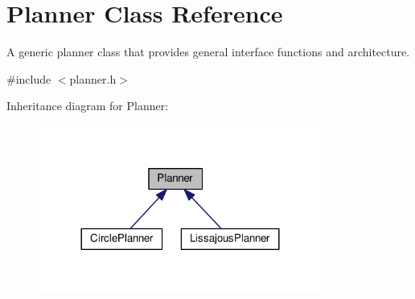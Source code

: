 \hypertarget{classPlanner}{}\section{Planner Class Reference}
\label{classPlanner}


A generic planner class that provides general interface functions and architecture.  




{\ttfamily \#include $<$planner.\+h$>$}



Inheritance diagram for Planner\+:\nopagebreak
\begin{figure}[H]
\begin{center}
\leavevmode
\includegraphics[width=264pt]{classPlanner__inherit__graph}
\end{center}
\end{figure}
